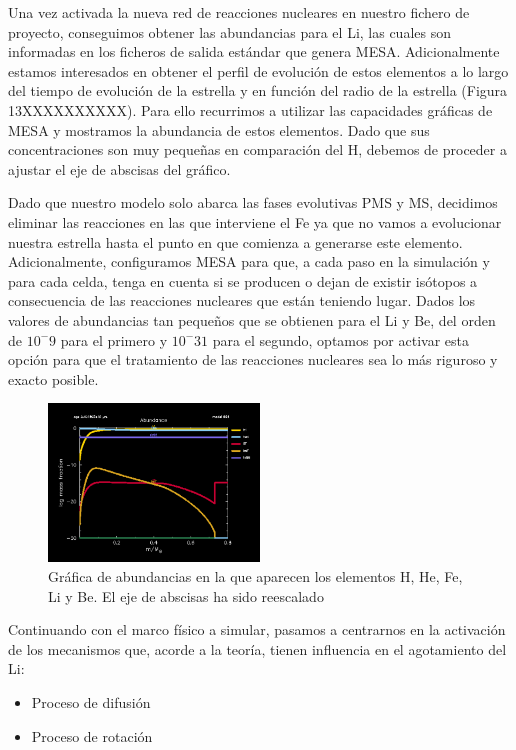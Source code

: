 Una vez activada la nueva red de reacciones nucleares en nuestro fichero de proyecto, conseguimos obtener las abundancias para el Li, las cuales son informadas en los ficheros de salida estándar que genera MESA. Adicionalmente estamos interesados en obtener el perfil de evolución de estos elementos a lo largo del tiempo de evolución de la estrella y en función del radio de la estrella (Figura 13XXXXXXXXXX). Para ello recurrimos a utilizar las capacidades gráficas de MESA y mostramos la abundancia de estos elementos. Dado que sus concentraciones son muy pequeñas en comparación del H, debemos de proceder a ajustar el eje de abscisas del gráfico.\par

Dado que nuestro modelo solo abarca las fases evolutivas PMS y MS, decidimos eliminar las reacciones en las que interviene el Fe ya que no vamos a evolucionar nuestra estrella hasta el punto en que comienza a generarse este elemento. Adicionalmente, configuramos MESA para que, a cada paso en la simulación y para cada celda, tenga en cuenta si se producen o dejan de existir isótopos a consecuencia de las reacciones nucleares que están teniendo lugar. Dados los valores de abundancias tan pequeños que se obtienen para el Li y Be, del orden de $10^-9$ para el primero y $10^-31$ para el segundo, optamos por activar esta opción para que el tratamiento de las reacciones nucleares sea lo más riguroso y exacto posible.\par

\begin{figure}
    \centering
    \includegraphics[width=0.5\textwidth]{img/tesis/abundances.pdf}
    \caption {Gráfica de abundancias en la que aparecen los elementos H, He, Fe, Li y Be. El eje de abscisas ha sido reescalado}
    \label{fig:abundances}
\end{figure}

Continuando con el marco físico a simular, pasamos a centrarnos en la activación de los mecanismos que, acorde a la teoría, tienen influencia en el agotamiento del Li:
\begin{itemize}
    \item Proceso de difusión
    \item Proceso de rotación
\end{itemize}

